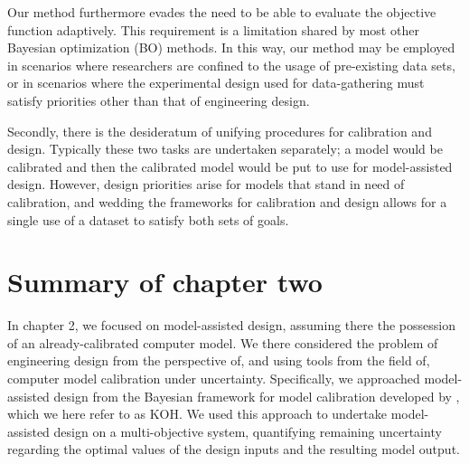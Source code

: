 \documentclass[12pt]{article}
\begin{document}
Our method furthermore evades the need to be able to evaluate the objective function adaptively.
This requirement is a limitation shared by most other Bayesian optimization (BO) methods.
In this way, our method may be employed in scenarios where researchers are confined to the usage of pre-existing data sets, or in scenarios where the experimental design used for data-gathering must satisfy priorities other than that of engineering design.

Secondly, there is the desideratum of unifying procedures for calibration and design.
Typically these two tasks are undertaken separately; a model would be calibrated and then the calibrated model would be put to use for model-assisted design.
However, design priorities arise for models that stand in need of calibration, and wedding the frameworks for calibration and design allows for a single use of a dataset to satisfy both sets of goals.

\section{Summary of chapter two}

In chapter 2, we focused on model-assisted design, assuming there the possession of an already-calibrated computer model.
We there considered the problem of engineering design from the perspective of, and using tools from the field of, computer model calibration under uncertainty.
Specifically, we approached model-assisted design from the Bayesian framework for model calibration developed by \citet{Kennedy2001}, which we here refer to as KOH.
We used this approach to undertake model-assisted design on a multi-objective system, quantifying remaining uncertainty regarding the optimal values of the design inputs and the resulting model output.
\end{document}
